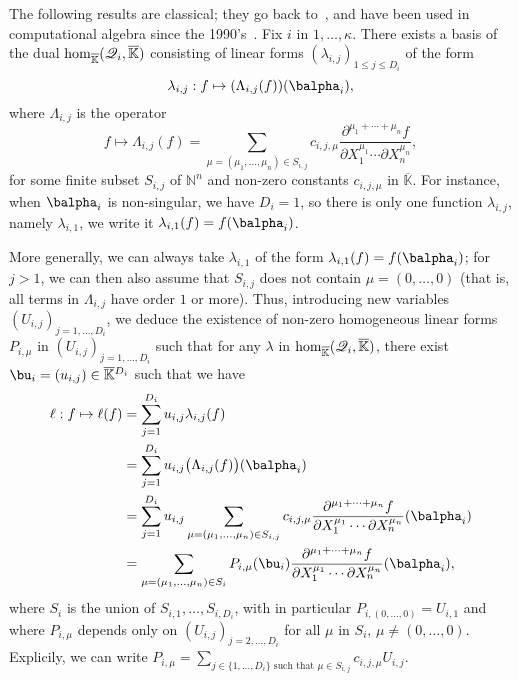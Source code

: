 \documentclass[12pt]{article}
\newcommand{\residueI}{\mathscr{Q}}
\def\dg{\kappa}
\def\N {\ensuremath{\mathbb{N}}}
\def\Kbar {{\ensuremath{\overline{\mathbb{K}}}}}
\def\D {\ensuremath{D}}
\begin{document}
The following results are classical; they go back
to~\cite{Macaulay16}, and have been used in computational algebra
since the 1990's~\cite{MaMoMo96,Mourrain97}. Fix $i$ in $1,\dots,\dg$.
There exists a basis of the dual ${\rm hom}_\Kbar(\residueI_i,\Kbar)$
consisting of linear forms $(\lambda_{i,j})_{1\le j \le \D_i}$ of the
form
$$\lambda_{i,j}: f \mapsto (\Lambda_{i,j}(f))(\balpha_i),$$
where $\Lambda_{i,j}$ is the operator
$$f \mapsto \Lambda_{i,j}(f) = \sum_{\mu=(\mu_1,\dots,\mu_n) \in
	S_{i,j}} c_{i,j,\mu} \frac{ \partial^{\mu_1 + \cdots + \mu_n} f}
{\partial X_1^{\mu_1} \cdots \partial X_n^{\mu_n}},$$ for some finite
subset $S_{i,j}$ of $\N^n$ and non-zero constants $c_{i,j,\mu}$ in
$\Kbar$. 
For instance, when $\balpha_i$ is non-singular, we have $D_i=1$, so
there is only one function $\lambda_{i,j}$, namely $\lambda_{i,1}$, we
write it $\lambda_{i,1}(f) = f(\balpha_i)$.

More generally, we can always take $\lambda_{i,1}$ of the form
$\lambda_{i,1}(f) = f(\balpha_i)$; for $j>1$, we can then also assume
that $S_{i,j}$ does not contain $\mu=(0,\dots,0)$ (that is, all terms
in $\Lambda_{i,j}$ have order $1$ or more). Thus, introducing new
variables $(U_{i,j})_{j =1,\dots,D_i}$, we deduce the existence of
non-zero homogeneous linear forms $P_{i,\mu}$ in
$(U_{i,j})_{j=1,\dots,D_i}$ such that for any $\lambda$ in ${\rm
	hom}_\Kbar(\residueI_i,\Kbar)$, there exist $\bu_i=(u_{i,j}) \in
\Kbar{}^{D_i}$ such that we have
\begin{align}\label{ell_param}
\ell: f \mapsto \ell(f)
&= \sum_{j=1}^{D_i} u_{i,j} \lambda_{i,j}(f)\nonumber\\
&= \sum_{j=1}^{D_i} u_{i,j} \big(\Lambda_{i,j}(f)\big)(\balpha_i)\nonumber\\
&= \sum_{j=1}^{D_i} u_{i,j}
\sum_{\mu=(\mu_1,\dots,\mu_n) \in
	S_{i,j}} c_{i,j,\mu} \frac{ \partial^{\mu_1 + \cdots + \mu_n} f}
{\partial X_1^{\mu_1} \cdots \partial X_n^{\mu_n}}(\balpha_i)\nonumber\\
&= \sum_{\mu=(\mu_1,\dots,\mu_n) \in S_i} P_{i,\mu}(\bu_i)
\frac{ \partial^{\mu_1 + \cdots + \mu_n} f}
{\partial X_1^{\mu_1} \cdots \partial X_n^{\mu_n}}(\balpha_i),
\end{align}
where $S_i$ is  the union of $S_{i,1},\dots,S_{i,D_i}$,
with in particular $P_{i,(0,\dots,0)}=U_{i,1}$ and where $P_{i,\mu}$
depends only on $(U_{i,j})_{j =2,\dots,D_i}$ for all $\mu$ in $S_i$,
$\mu \ne (0,\dots,0)$. Explicily, we can write $P_{i,\mu}=\sum_{j\in
	\{1,\dots,D_i\} \text{~such that~} \mu \in S_{i,j}} c_{i,j,\mu}
U_{i,j}$. 
\end{document}
